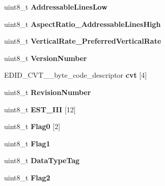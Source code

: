 \begin{DoxyCompactItemize}
uint8\+\_\+t {\bfseries Addressable\+Lines\+Low}
\item 
\mbox{\label{structRTEMS__PACKED_a9d7f74ad877a4b01abfc33d878f64e72}} 
uint8\+\_\+t {\bfseries Aspect\+Ratio\+\_\+\+Addressable\+Lines\+High}
\item 
\mbox{\label{structRTEMS__PACKED_a14333d10d71ef713b4ae202a2cdd44a7}} 
uint8\+\_\+t {\bfseries Vertical\+Rate\+\_\+\+Preferred\+Vertical\+Rate}
\item 
\mbox{\label{structRTEMS__PACKED_a6fa2f27a85653a58168288ae5b883696}} 
uint8\+\_\+t {\bfseries Version\+Number}
\item 
\mbox{\label{structRTEMS__PACKED_aa1132c548694cc52a835ab8d95968719}} 
E\+D\+I\+D\+\_\+\+C\+V\+T\+\_\+\_\+byte\+\_\+code\+\_\+descriptor {\bfseries cvt} \mbox{[}4\mbox{]}
\item 
\mbox{\label{structRTEMS__PACKED_a29f67b5f674a2a55b309e33de37bb133}} 
uint8\+\_\+t {\bfseries Revision\+Number}
\item 
\mbox{\label{structRTEMS__PACKED_a359387a152dd4df07688b8ee05d54fc6}} 
uint8\+\_\+t {\bfseries E\+S\+T\+\_\+\+I\+II} \mbox{[}12\mbox{]}
\item 
\mbox{\label{structRTEMS__PACKED_a69420b2775b093ad1a8326d3b2e90c77}} 
uint8\+\_\+t {\bfseries Flag0} \mbox{[}2\mbox{]}
\item 
\mbox{\label{structRTEMS__PACKED_a275c6197ac67b90bd41edccd5984cf99}} 
uint8\+\_\+t {\bfseries Flag1}
\item 
\mbox{\label{structRTEMS__PACKED_a6a239db26dc2409141cfbef16f36784c}} 
uint8\+\_\+t {\bfseries Data\+Type\+Tag}
\item 
\mbox{\label{structRTEMS__PACKED_a213f10e8f2822daf285fcc17ba7acbf7}} 
uint8\+\_\+t {\bfseries Flag2}
\item 
\mbox{\label{structRTEMS__PACKED_a9dcfef00dbe2fccec1f89788e2c083fe}} 

\end{DoxyCompactItemize}
